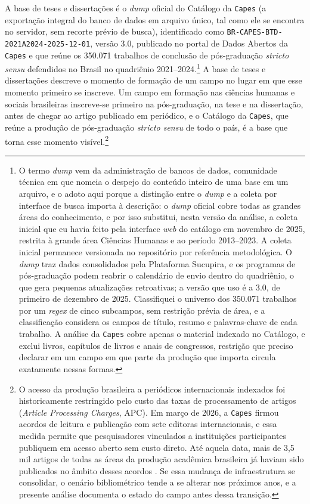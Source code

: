 A base de teses e dissertações é o \emph{dump} oficial do Catálogo da \texttt{Capes} (a exportação integral do banco de dados em arquivo único, tal como ele se encontra no servidor, sem recorte prévio de busca), identificado como \texttt{BR-CAPES-BTD-2021A2024-2025-12-01}, versão 3.0, publicado no portal de Dados Abertos da \texttt{Capes} e que reúne os 350.071 trabalhos de conclusão de pós-graduação \textit{stricto sensu} defendidos no Brasil no quadriênio 2021--2024.\footnote{O termo \emph{dump} vem da administração de bancos de dados, comunidade técnica em que nomeia o despejo do conteúdo inteiro de uma base em um arquivo, e o adoto aqui porque a distinção entre o \emph{dump} e a coleta por interface de busca importa à descrição: o \emph{dump} oficial cobre todas as grandes áreas do conhecimento, e por isso substitui, nesta versão da análise, a coleta inicial que eu havia feito pela interface \emph{web} do catálogo em novembro de 2025, restrita à grande área Ciências Humanas e ao período 2013--2023. A coleta inicial permanece versionada no repositório por referência metodológica. O \emph{dump} traz dados consolidados pela Plataforma Sucupira, e os programas de pós-graduação podem reabrir o calendário de envio dentro do quadriênio, o que gera pequenas atualizações retroativas; a versão que uso é a 3.0, de primeiro de dezembro de 2025. Classifiquei o universo dos 350.071 trabalhos por um \emph{regex} de cinco subcampos, sem restrição prévia de área, e a classificação considera os campos de título, resumo e palavras-chave de cada trabalho. A análise da \texttt{Capes} cobre apenas o material indexado no Catálogo, e exclui livros, capítulos de livros e anais de congressos, restrição que preciso declarar em um campo em que parte da produção que importa circula exatamente nessas formas.} A base de teses e dissertações descreve o momento de formação de um campo no lugar em que esse momento primeiro se inscreve. Um campo em formação nas ciências humanas e sociais brasileiras inscreve-se primeiro na pós-graduação, na tese e na dissertação, antes de chegar ao artigo publicado em periódico, e o Catálogo da \texttt{Capes}, que reúne a produção de pós-graduação \textit{stricto sensu} de todo o país, é a base que torna esse momento visível.\footnote{O acesso da produção brasileira a periódicos internacionais indexados foi historicamente restringido pelo custo das taxas de processamento de artigos (\textit{Article Processing Charges}, APC). Em março de 2026, a \texttt{Capes} firmou acordos de leitura e publicação com sete editoras internacionais, e essa medida permite que pesquisadores vinculados a instituições participantes publiquem em acesso aberto sem custo direto. Até aquela data, mais de 3,5 mil artigos de todas as áreas da produção acadêmica brasileira já haviam sido publicados no âmbito desses acordos \parencite{CAPES_APC_2026}. Se essa mudança de infraestrutura se consolidar, o cenário bibliométrico tende a se alterar nos próximos anos, e a presente análise documenta o estado do campo antes dessa transição.}

